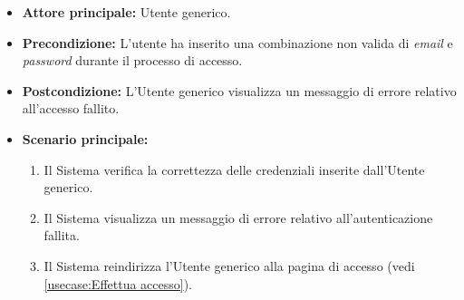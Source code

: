 \label{usecase:Accesso fallito}

\begin{itemize}
	\item \textbf{Attore principale:} Utente generico.
	\item \textbf{Precondizione:}
    L'utente ha inserito una combinazione non valida di \textit{email} e \textit{password} durante il processo di accesso.
	\item \textbf{Postcondizione:} L'Utente generico visualizza un messaggio di errore relativo all'accesso fallito.

	\item \textbf{Scenario principale:}
	\begin{enumerate}
        \item Il Sistema verifica la correttezza delle credenziali inserite dall'Utente generico.
        \item Il Sistema visualizza un messaggio di errore relativo all'autenticazione fallita.
        \item Il Sistema reindirizza l'Utente generico alla pagina di accesso (vedi \autoref{usecase:Effettua accesso}).
    \end{enumerate}
	
\end{itemize}
